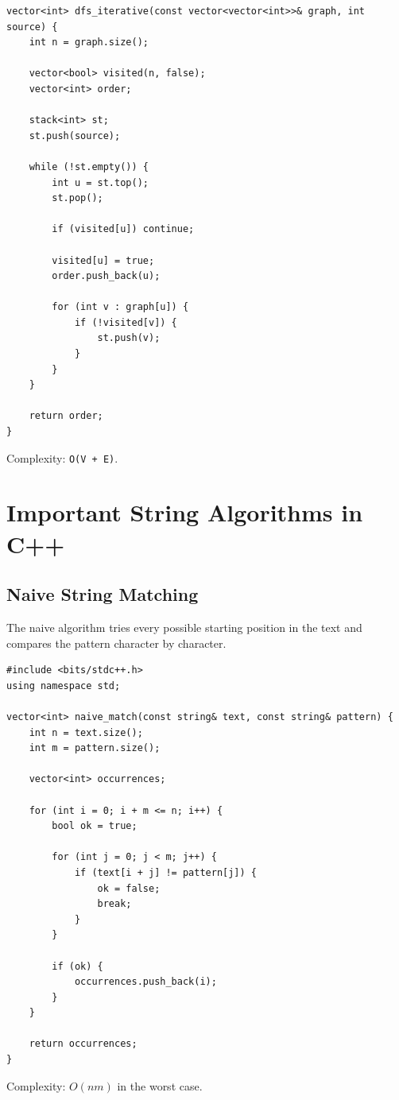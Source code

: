 \documentclass[11pt]{article}
\begin{document}
\begin{lstlisting}
vector<int> dfs_iterative(const vector<vector<int>>& graph, int source) {
    int n = graph.size();

    vector<bool> visited(n, false);
    vector<int> order;

    stack<int> st;
    st.push(source);

    while (!st.empty()) {
        int u = st.top();
        st.pop();

        if (visited[u]) continue;

        visited[u] = true;
        order.push_back(u);

        for (int v : graph[u]) {
            if (!visited[v]) {
                st.push(v);
            }
        }
    }

    return order;
}
\end{lstlisting}

Complexity: \texttt{O(V + E)}.

\section{Important String Algorithms in C++}

\subsection{Naive String Matching}

The naive algorithm tries every possible starting position in the text and
compares the pattern character by character.

\begin{lstlisting}
#include <bits/stdc++.h>
using namespace std;

vector<int> naive_match(const string& text, const string& pattern) {
    int n = text.size();
    int m = pattern.size();

    vector<int> occurrences;

    for (int i = 0; i + m <= n; i++) {
        bool ok = true;

        for (int j = 0; j < m; j++) {
            if (text[i + j] != pattern[j]) {
                ok = false;
                break;
            }
        }

        if (ok) {
            occurrences.push_back(i);
        }
    }

    return occurrences;
}
\end{lstlisting}

Complexity: $O(nm)$ in the worst case.
\end{document}
